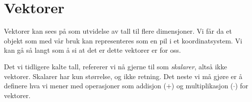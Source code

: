 
\section{Vektorer}
Vektorer kan sees på som utvidelse av tall til flere dimensjoner. Vi får da et objekt som med vår bruk kan representeres som en pil i et koordinatsystem. Vi kan gå så langt som å si at det er dette vektorer er for oss.

Det vi tidligere kalte tall, refererer vi nå gjerne til som \textit{skalarer}, altså ikke vektorer. Skalarer har kun størrelse, og ikke retning. Det neste vi må gjøre er å definere hva vi mener med operasjoner som addisjon ($+$) og multiplikasjon ($\cdot$) for vektorer. 

